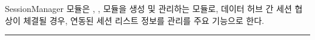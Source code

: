\documentclass[a4paper,10pt,english]{sphinxmanual}
\begin{document}
\sphinxAtStartPar
SessionManager 모듈은 {\hyperref[\detokenize{_SessionRequester:sessionrequester}]{}}, {\hyperref[\detokenize{_SessionListener:sessionlistener}]{}}, {\hyperref[\detokenize{_Session:session}]{}} 모듈을 생성 및 관리하는 모듈로, 데이터 허브 간 세션 협상이 체결될 경우, 연동된 세션 리스트 정보를 관리를 주요 기능으로 한다.



\bigskip\hrule\bigskip

\end{document}

